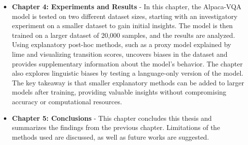 \begin{itemize}
    
    \item \textbf{Chapter 4: Experiments and Results} - In this chapter, the Alpaca-VQA model is tested on two different dataset sizes, starting with an investigatory experiment on a smaller dataset to gain initial insights. The model is then trained on a larger dataset of 20,000 samples, and the results are analyzed. Using explanatory post-hoc methods, such as a proxy model explained by \gls{lime} and visualizing transition scores, uncovers biases in the dataset and provides supplementary information about the model's behavior. The chapter also explores linguistic biases by testing a language-only version of the model. The key takeaway is that smaller explanatory methods can be added to larger models after training, providing valuable insights without compromising accuracy or computational resources.
    
    \item \textbf{Chapter 5: Conclusions} - This chapter concludes this thesis and summarizes the findings from the previous chapter. Limitations of the methods used are discussed, as well as future works are suggested. 

\end{itemize}


